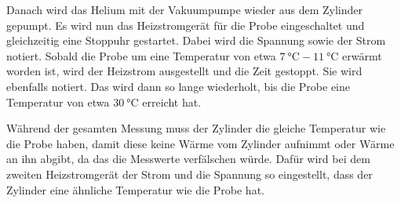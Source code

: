 Danach wird das Helium mit der Vakuumpumpe wieder aus dem Zylinder gepumpt. Es wird nun das Heizstromgerät für 
die Probe eingeschaltet und gleichzeitig eine Stoppuhr gestartet. Dabei wird die Spannung sowie der Strom notiert. 
Sobald die Probe um eine Temperatur von etwa $\SI{7}{\celsius}-\SI{11}{\celsius}$
erwärmt worden ist, wird der Heizstrom ausgestellt und die Zeit gestoppt. Sie wird ebenfalls notiert. 
Das wird dann so lange wiederholt, bis die Probe eine Temperatur von etwa $\SI{30}{\celsius}$ 
erreicht hat. 

Während der gesamten Messung muss der Zylinder die gleiche Temperatur wie die Probe haben, damit 
diese keine Wärme vom Zylinder aufnimmt oder Wärme an ihn abgibt, da das die Messwerte verfälschen würde. 
Dafür wird bei dem zweiten Heizstromgerät der Strom und die Spannung so eingestellt, dass der Zylinder eine ähnliche Temperatur wie die Probe hat. 